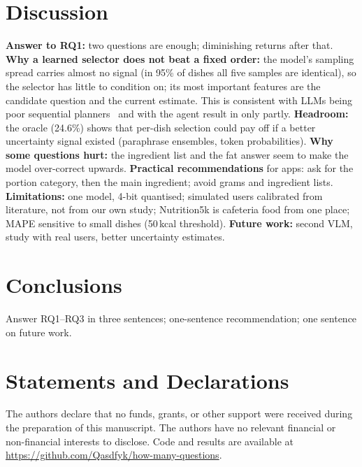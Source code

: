 \documentclass[twocolumn]{svjour3}
\newcommand{\plan}[1]{{\color{blue!70!black}#1}}   %
\begin{document}
\section{Discussion}
\label{sec:discussion}
\plan{
\textbf{Answer to RQ1:} two questions are enough; diminishing returns after that.
\textbf{Why a learned selector does not beat a fixed order:} the model's sampling spread carries almost no
signal (in 95\% of dishes all five samples are identical), so the selector has little to condition on;
its most important features are the candidate question and the current estimate. This is consistent with
LLMs being poor sequential planners~\cite{perets2026zeroshot} and with the agent result in
\cite{bhatambarekar2026agentic} only partly. \textbf{Headroom:} the oracle (24.6\%) shows that per-dish
selection could pay off if a better uncertainty signal existed (paraphrase ensembles, token
probabilities). \textbf{Why some questions hurt:} the ingredient list and the fat answer seem to make the
model over-correct upwards. \textbf{Practical recommendations} for apps: ask for the portion category, then
the main ingredient; avoid grams and ingredient lists. \textbf{Limitations:} one model, 4-bit quantised;
simulated users calibrated from literature, not from our own study; Nutrition5k is cafeteria food from
one place; MAPE sensitive to small dishes (50\,kcal threshold). \textbf{Future work:} second VLM, study
with real users, better uncertainty estimates.
}

\section{Conclusions}
\label{sec:conclusions}
\plan{Answer RQ1--RQ3 in three sentences; one-sentence recommendation; one sentence on future work.}

\section*{Statements and Declarations}
The authors declare that no funds, grants, or other support were received during the preparation of this
manuscript. The authors have no relevant financial or non-financial interests to disclose. Code and
results are available at \url{https://github.com/Qasdfyk/how-many-questions}.

\balance


\end{document}
